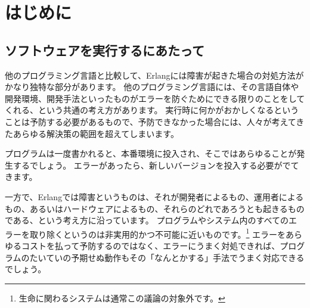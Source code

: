 \chapter*{はじめに}
\label{chap:introduction}

\section*{ソフトウェアを実行するにあたって}
\label{sec:on-running-software}


他のプログラミング言語と比較して、Erlangには障害が起きた場合の対処方法がかなり独特な部分があります。
他のプログラミング言語には、その言語自体や開発環境、開発手法といったものがエラーを防ぐためにできる限りのことをしてくれる、という共通の考え方があります。
実行時に何かがおかしくなるということは予防する必要があるもので、予防できなかった場合には、人々が考えてきたあらゆる解決策の範囲を超えてしまいます。

プログラムは一度書かれると、本番環境に投入され、そこではあらゆることが発生するでしょう。
エラーがあったら、新しいバージョンを投入する必要がでてきます。

一方で、Erlangでは障害というものは、それが開発者によるもの、運用者によるもの、あるいはハードウェアによるもの、それらのどれであろうとも起きるものである、という考え方に沿っています。
プログラムやシステム内のすべてのエラーを取り除くというのは非実用的かつ不可能に近いものです。\footnote{生命に関わるシステムは通常この議論の対象外です。}
エラーをあらゆるコストを払って予防するのではなく、エラーにうまく対処できれば、プログラムのたいていの予期せぬ動作もその「なんとかする」手法でうまく対応できるでしょう。

